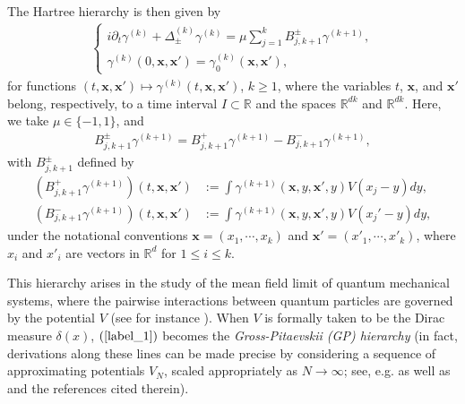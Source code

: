 \documentclass[reqno]{amsart}
\numberwithin{equation}{section}
\theoremstyle{remark}
\begin{document}
The Hartree hierarchy is then given by
\begin{align}
\label{label_1}\left\lbrace\begin{array}{c}i\partial_t \gamma^{(k)}+\Delta^{(k)}_\pm\gamma^{(k)}=\mu\sum_{j=1}^k B_{j,k+1}^\pm\gamma^{(k+1)},\\
\gamma^{(k)}(0,{\mathbf x},{\mathbf x}')=\gamma^{(k)}_0({\mathbf x},{\mathbf x}'),\end{array}\right.
\end{align}
for functions $(t,{\mathbf x},{\mathbf x}')\mapsto \gamma^{(k)}(t,{\mathbf x},{\mathbf x}')$, $k\geq 1$, where the variables $t$, ${\mathbf x}$, and ${\mathbf x}'$ belong, respectively, to a time interval $I\subset \mathbb{R}$ and the spaces $\mathbb{R}^{dk}$ and $\mathbb{R}^{dk}$.  Here, we take $\mu\in \{-1,1\}$, and 
\begin{align*}
B_{j,k+1}^\pm\gamma^{(k+1)}=B_{j,k+1}^+\gamma^{(k+1)}-B_{j,k+1}^-\gamma^{(k+1)},
\end{align*}
with $B_{j,k+1}^\pm$ defined by
\begin{align*}
(B_{j,k+1}^+\gamma^{(k+1)})(t,{\mathbf  x},{\mathbf x}')&:=\int \gamma^{(k+1)}({\mathbf x},y,{\mathbf x}',y)V(x_j-y)dy,\\
(B_{j,k+1}^-\gamma^{(k+1)})(t,{\mathbf x},{\mathbf x}')&:=\int \gamma^{(k+1)}({\mathbf x},y,{\mathbf x}',y)V(x_j'-y)dy,
\end{align*}
under the notational conventions ${\mathbf x}=(x_1,\cdots,x_k)$ and ${\mathbf x}'=(x'_1,\cdots,x'_k)$, where $x_i$ and $x'_i$ are vectors in $\mathbb{R}^d$ for $1\leq i\leq k$.  

This hierarchy arises in the study of the mean field limit of quantum mechanical systems, where the pairwise interactions between quantum particles are governed by the potential $V$ (see for instance \cite{S}).  When $V$ is formally taken to be the Dirac measure $\delta(x)$, $(\ref{label_1})$ becomes the {\it Gross-Pitaevskii (GP) hierarchy} (in fact, derivations along these lines can be made precise by considering a sequence of approximating potentials $V_N$, scaled appropriately as $N\rightarrow\infty$; see, e.g. \cite{ESY,ESY2,KM} as well as \cite{CPT,CPHigher,CH,CHPS,CHPS2,KSS,S} and the references cited therein).  
\end{document}
